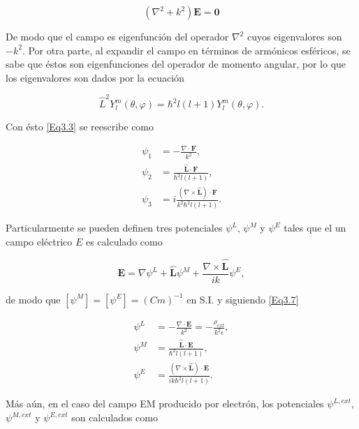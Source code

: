 \documentclass[a4paper,10pt]{article}
\newcommand{\hatbf}[1] {\hat{\mathbf{#1}}}	%
\begin{document}
\begin{equation}
(\nabla^2+k^2)\textbf{E}=\textbf{0}
\end{equation}

De modo que el campo es eigenfunción del operador $\nabla^2$ cuyos eigenvalores son $-k^2$. Por otra parte, al expandir el campo en términos de armónicos esféricos, se sabe que éstos son eigenfunciones del operador de momento angular, por lo que los eigenvalores son dados por la ecuación

\begin{equation}
\hat{L}^2 Y_l^m(\theta,\varphi)=\hbar^2 l(l+1) Y_l^m(\theta,\varphi).
\end{equation}

Con ésto \eqref{Eq3.3} se reescribe como

\begin{subequations}
\begin{align}
\psi_1	&=-\frac{\nabla\cdot\textbf{F}}{k^2},	\\
\psi_2	&=\frac{\hatbf{L}\cdot\textbf{F}}{\hbar^2l(l+1)}	,	\\
\psi_3	&=i\frac{(\nabla\times\hatbf{L})\cdot\textbf{F}}{k^2\hbar^2l(l+1)}.
\end{align}
\label{Eq3.7}
\end{subequations}

Particularmente se pueden definen tres potenciales $\psi^L$, $\psi^M$ y $\psi^E$ tales que el un campo eléctrico $E$ es calculado como

\begin{equation}
\textbf{E}=\nabla\psi^L+\hatbf{L}\psi^M+\frac{\nabla\times\hatbf{L}}{ik}\psi^E,
\end{equation}

de modo que $[\psi^M]=[\psi^E]=(Cm)^{-1}$ en \textsc{S.I.} y siguiendo \eqref{Eq3.7}

\begin{subequations}
\begin{align}
\psi^L	&=-\frac{\nabla\cdot\textbf{E}}{k^2}=-\frac{\rho_{ext}}{k^2\epsilon},	\\
\psi^M	&=\frac{\hatbf{L}\cdot\textbf{E}}{\hbar^2l(l+1)}	,	\\
\psi^E	&=\frac{(\nabla\times\hatbf{L})\cdot\textbf{E}}{ik\hbar^2l(l+1)}.
\end{align}
\end{subequations}

Más aún, en el caso del campo EM producido por electrón, los potenciales $\psi^{L,ext}$, $\psi^{M,ext}$ y $\psi^{E,ext}$ son calculados como
\end{document}
